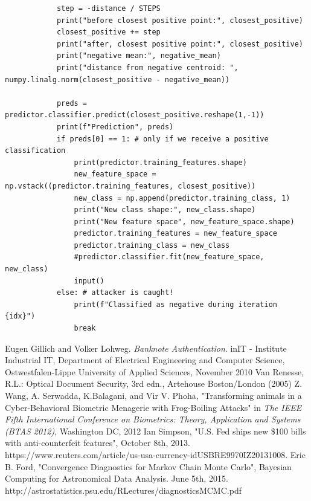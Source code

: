\documentclass{article}
\begin{document}
\begin{appendices}
\begin{lstlisting}
            step = -distance / STEPS
            print("before closest positive point:", closest_positive)
            closest_positive += step
            print("after, closest positive point:", closest_positive)
            print("negative mean:", negative_mean)
            print("distance from negative centroid: ", numpy.linalg.norm(closest_positive - negative_mean))

            preds = predictor.classifier.predict(closest_positive.reshape(1,-1))
            print(f"Prediction", preds)
            if preds[0] == 1: # only if we receive a positive classification
                print(predictor.training_features.shape)
                new_feature_space = np.vstack((predictor.training_features, closest_positive))
                new_class = np.append(predictor.training_class, 1)
                print("New class shape:", new_class.shape)
                print("New feature space", new_feature_space.shape)
                predictor.training_features = new_feature_space
                predictor.training_class = new_class
                #predictor.classifier.fit(new_feature_space, new_class)
                input()
            else: # attacker is caught!
                print(f"Classified as negative during iteration {idx}")
                break
 \end{lstlisting}
        
\end{appendices}


\begin{thebibliography}{9}
Eugen Gillich and Volker Lohweg. \textit{Banknote Authentication}. inIT - Institute Industrial IT, Department of Electrical Engineering and Computer Science, Ostwestfalen-Lippe University of Applied Sciences, November 2010
Van Renesse, R.L.: Optical Document Security, 3rd edn., Artehouse Boston/London
(2005)
 Z. Wang, A. Serwadda, K.Balagani, and Vir V. Phoha, "Transforming animals in a Cyber-Behavioral Biometric Menagerie with Frog-Boiling Attacks" in \textit{The IEEE Fifth International Conference on Biometrics: Theory, Application and Systems (BTAS 2012)}, Washington DC, 2012
Ian Simpson, "U.S. Fed ships new \$100 bills with anti-counterfeit features", October 8th, 2013. https://www.reuters.com/article/us-usa-currency-idUSBRE9970IZ20131008.
 Eric B. Ford, "Convergence Diagnostics for Markov Chain Monte Carlo", Bayesian Computing for Astronomical Data Analysis. June 5th, 2015. http://astrostatistics.psu.edu/RLectures/diagnosticsMCMC.pdf

\end{thebibliography}
\end{document}
